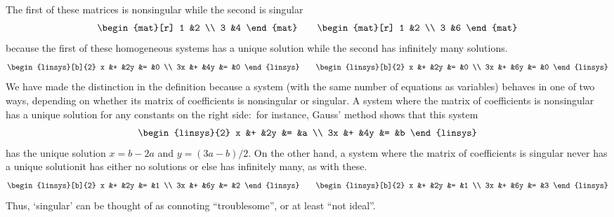 \begin{example}
The first of these matrices is nonsingular while the second is singular
\begin{equation*}
  \begin{mat}[r]
    1  &2  \\
    3  &4
  \end{mat}
  \qquad
  \begin{mat}[r]
    1  &2  \\
    3  &6
  \end{mat}
\end{equation*}
because the first of these homogeneous systems has a unique solution 
while the second has infinitely many solutions.
\begin{equation*}
  \begin{linsys}[b]{2}
    x &+  &2y  &=  &0  \\
   3x &+  &4y  &=  &0  
  \end{linsys}
  \qquad
  \begin{linsys}[b]{2}
    x &+  &2y  &=  &0  \\
   3x &+  &6y  &=  &0
  \end{linsys}
\end{equation*}  
We have made the distinction in the definition because a system
(with the same number of equations as variables)
behaves in one of two ways, depending on whether its matrix of coefficients
is nonsingular or singular.
A system where the matrix of coefficients is nonsingular 
has a unique solution for any constants on the right 
side:~for instance, Gauss' method shows that this system
\begin{equation*}
  \begin{linsys}{2}
    x  &+  &2y  &=  &a \\
    3x &+  &4y  &=  &b
  \end{linsys}
\end{equation*}
has the unique solution $x=b-2a$ and  $y=(3a-b)/2$.
On the other hand, a system where the matrix of coefficients is
singular never has a unique solution\Dash it 
has either no solutions or else has infinitely many, as with these.
\begin{equation*}
  \begin{linsys}[b]{2}
    x  &+  &2y  &=   &1   \\
   3x  &+  &6y  &=   &2   
  \end{linsys}
  \qquad
  \begin{linsys}[b]{2}
    x  &+  &2y  &=   &1   \\
   3x  &+  &6y  &=   &3
  \end{linsys}
\end{equation*} 
Thus, `singular' can be thought of as connoting 
``troublesome'', or at least ``not ideal''.
\end{example}

